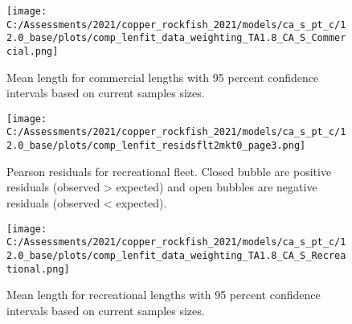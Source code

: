 \documentclass[11pt,
  english,
  a4paper,
]{article}
\begin{document}
\tagmcend\tagstructend


\begin{figure}
\centering
\texttt{[image: C:/Assessments/2021/copper\_rockfish\_2021/models/ca\_s\_pt\_c/12.0\_base/plots/comp\_lenfit\_data\_weighting\_TA1.8\_CA\_S\_Commercial.png]}
\caption{Mean length for commercial lengths with 95 percent confidence intervals based on current samples sizes.\label{fig:com-mean-len-fit}}
\end{figure}

\tagmcend\tagstructend


\begin{figure}
\centering
\texttt{[image: C:/Assessments/2021/copper\_rockfish\_2021/models/ca\_s\_pt\_c/12.0\_base/plots/comp\_lenfit\_residsflt2mkt0\_page3.png]}
\caption{Pearson residuals for recreational fleet. Closed bubble are positive residuals (observed \textgreater{} expected) and open bubbles are negative residuals (observed \textless{} expected).\label{fig:rec-pearson}}
\end{figure}

\tagmcend\tagstructend


\begin{figure}
\centering
\texttt{[image: C:/Assessments/2021/copper\_rockfish\_2021/models/ca\_s\_pt\_c/12.0\_base/plots/comp\_lenfit\_data\_weighting\_TA1.8\_CA\_S\_Recreational.png]}
\caption{Mean length for recreational lengths with 95 percent confidence intervals based on current samples sizes.\label{fig:rec-mean-len-fit}}
\end{figure}

\tagmcend\tagstructend

\end{document}
